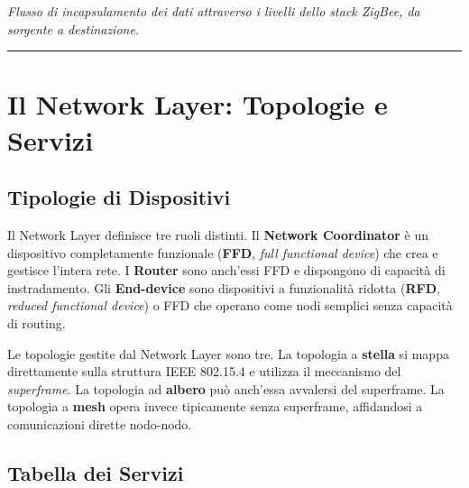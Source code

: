 \documentclass[
  italian,
  openany]{book}
\begin{document}
\emph{Flusso di incapsulamento dei dati attraverso i livelli dello stack
ZigBee, da sorgente a destinazione.}

\begin{center}\rule{0.5\linewidth}{0.5pt}\end{center}

\section{Il Network Layer: Topologie e
Servizi}\label{il-network-layer-topologie-e-servizi}

\subsection{Tipologie di Dispositivi}\label{tipologie-di-dispositivi}

Il Network Layer definisce tre ruoli distinti. Il \textbf{Network
Coordinator} è un dispositivo completamente funzionale (\textbf{FFD},
\emph{full functional device}) che crea e gestisce l'intera rete. I
\textbf{Router} sono anch'essi FFD e dispongono di capacità di
instradamento. Gli \textbf{End-device} sono dispositivi a funzionalità
ridotta (\textbf{RFD}, \emph{reduced functional device}) o FFD che
operano come nodi semplici senza capacità di routing.

Le topologie gestite dal Network Layer sono tre. La topologia a
\textbf{stella} si mappa direttamente sulla struttura IEEE 802.15.4 e
utilizza il meccanismo del \emph{superframe}. La topologia ad
\textbf{albero} può anch'essa avvalersi del superframe. La topologia a
\textbf{mesh} opera invece tipicamente senza superframe, affidandosi a
comunicazioni dirette nodo-nodo.

\subsection{Tabella dei Servizi}\label{tabella-dei-servizi}
\end{document}
